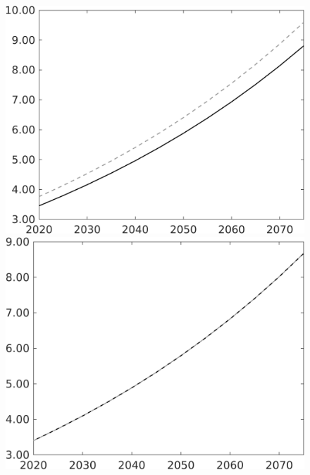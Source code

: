 \documentclass[12pt]{article}
\begin{document}
\begin{figure}[h!!]
\begin{minipage}[]{0.32\textwidth}
	\end{minipage}	
	\begin{minipage}[]{0.32\textwidth}
		\includegraphics[width=1\textwidth]{../../codding_model/own_basedOnFried/optimalPol_010922_revision/figures/all_13Sept22/CompTaul_Equlab_LFBAU_Reg0_Y_spillover0_nsk1_xgr0_knspil0_sep1_countec0_GovRev0_etaa0.79_lgd0.png}
	\end{minipage}	
	\begin{minipage}[]{0.32\textwidth}
		\includegraphics[width=1\textwidth]{../../codding_model/own_basedOnFried/optimalPol_010922_revision/figures/all_13Sept22/CompTaul_Equlab_LFBAU_Reg0_wh_spillover0_nsk1_xgr0_knspil0_sep1_countec0_GovRev0_etaa0.79_lgd0.png}

\end{minipage}
\end{figure}
\end{document}
